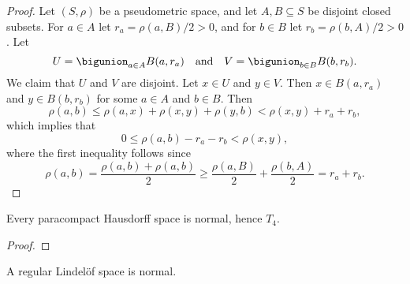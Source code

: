 \documentclass[article, a4paper, 11pt, oneside]{memoir}
\numberwithin{equation}{chapter}
\begin{document}
\begin{proof}
    Let $(S,\rho)$ be a pseudometric space, and let $A, B \subseteq S$ be disjoint closed subsets. For $a \in A$ let $r_a = \rho(a,B)/2 > 0$, and for $b \in B$ let $r_b = \rho(b,A)/2 > 0$. Let
    \begin{equation*}
        U = \bigunion_{a \in A} B(a,r_a)
        \quad \text{and} \quad
        V = \bigunion_{b \in B} B(b,r_b).
    \end{equation*}
    We claim that $U$ and $V$ are disjoint. Let $x \in U$ and $y \in V$. Then $x \in B(a,r_a)$ and $y \in B(b,r_b)$ for some $a \in A$ and $b \in B$. Then
    \begin{equation*}
        \rho(a,b)
            \leq \rho(a,x) + \rho(x,y) + \rho(y,b)
            < \rho(x,y) + r_a + r_b,
    \end{equation*}
    which implies that
    \begin{equation*}
        0
            \leq \rho(a,b) - r_a - r_b
            < \rho(x,y),
    \end{equation*}
    where the first inequality follows since
    \begin{equation*}
        \rho(a,b)
            = \frac{\rho(a,b) + \rho(a,b)}{2}
            \geq \frac{\rho(a,B)}{2} + \frac{\rho(b,A)}{2}
            = r_a + r_b.
    \end{equation*}
\end{proof}



\begin{proposition}
    \label{thm:paracompact-Hausdorff-is-normal}
    Every paracompact Hausdorff space is normal, hence $T_4$.
\end{proposition}

\begin{proof}
    
\end{proof}


\begin{proposition}
    A regular Lindelöf space is normal.
\end{proposition}
\end{document}
